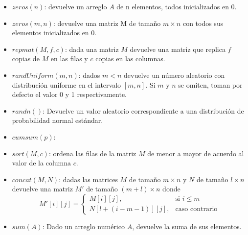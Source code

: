 \documentclass{llncs}
\begin{document}
	\begin{itemize}
		\item $zeros(n)$: devuelve un arreglo $A$ de n elementos, todos inicializados en 0.
		\item $zeros (m, n)$: devuelve una matriz M de tamaño $m \times n$ con todos sus elementos inicializados en 0.
		\item $repmat(M, f, c)$: dada una matriz $M$ devuelve una matriz que replica $f$ copias de $M$ en las filas y $c$ copias en las
		columnas.
		\item $randUniform(m, n)$: dados $m < n$ devuelve un número aleatorio con distribución uniforme en el intervalo
		 $[m,n]$. Si $m$ y $n$ se omiten, toman por defecto el valor 0 y 1 respectivamente. 
		\item $randn()$: Devuelve un valor aleatorio correspondiente a una distribución de probabilidad normal estándar.
		\item $cumsum(p)$:
		\item $sort(M, c)$: ordena las filas de la matriz $M$ de menor a mayor de acuerdo al valor de la columna $c$.
		\item $concat(M,N)$: dadas las matrices $M$ de tamaño $m \times n$ y $N$ de tamaño $l \times n$ devuelve una matriz $M'$
		de tamaño $(m+l) \times n$ donde
		\begin{equation*}
		M'[i][j] =
		\begin{cases}
		M[i][j],& \text{si } i \leq m\\
		N[l+(i-m-1)][j],              & \text{caso contrario}
		\end{cases}
		\end{equation*}
		\item $sum(A)$: Dado un arreglo numérico $A$, devuelve la suma de sus elementos. 
	\end{itemize}
	
\end{document}
